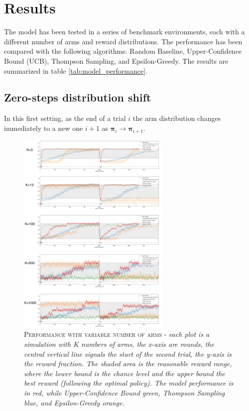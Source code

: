 
\section{Results}

The model has been tested in a series of benchmark environments, each with a different number of arms and reward distributions. The performance has been compared with the following algorithms: Random Baseline, Upper-Confidence Bound (UCB), Thompson Sampling, and Epsilon-Greedy. The results are summarized in table \ref{tab:model_performance}.

\subsection{Zero-steps distribution shift}
In this first setting, as the end of a trial $i$ the arm distribution changes immediately to a new one $i+1$ as $\mathbf{\pi}_{i} \to \mathbf{\pi}_{i+1}$.

\begin{figure}[ht]
    \centering
    \includegraphics[width=0.65\textwidth]{figures/drawing.png}
    \caption{\textsc{Performance with variable number of arms} - \textit{each plot is a simulation with K numbers of arms, the x-axis are rounds, the central vertical line signals the start of the second trial, the y-axis is the reward fraction.
            The shaded area is the reasonable reward
    range, where the lower bound is the chance level and the upper bound the best reward (following the optimal policy). The model performance is in red, while Upper-Confidence Bound green, Thompson Sampling blue, and Epsilon-Greedy orange. }}
\label{fig:zero_1}
\end{figure}


